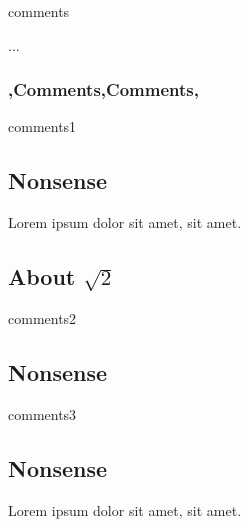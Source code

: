
\begin{saveblock}{comments}
	\begin{highlightblock}[linewidth=0.9\textwidth,gobble=8]
		\let\UL\ul
		\makeatletter
		\renewcommand\ul{
			\let\set@color\beamerorig@set@color
			\let\reset@color\beamerorig@reset@color
			\UL
		}
		...
	\end{highlightblock}
\end{saveblock}

\begin{frame}
	\frametitle{\lang,Comments,Comments,}

\end{frame}

\begin{saveblock}{comments1}
	\begin{highlightblock}[linewidth=0.6\textwidth,gobble=8]
		\section{Nonsense}

		Lorem ipsum dolor sit amet,
		 sit amet.

		\subsection{About $\sqrt{2}$}
	\end{highlightblock}
\end{saveblock}

\begin{saveblock}{comments2}
	\begin{highlightblock}[linewidth=0.6\textwidth,gobble=8]
		\section{Nonsense}

	\end{highlightblock}
\end{saveblock}

\begin{saveblock}{comments3}
	\begin{highlightblock}[linewidth=0.6\textwidth,gobble=8]
		\section{Nonsense}

		Lorem ipsum dolor sit amet,
		 sit amet.
		
	\end{highlightblock}
\end{saveblock}

